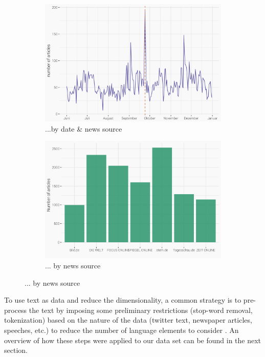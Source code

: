 \documentclass[12pt,a4paper,notitlepage]{article}
\begin{document}
\begin{figure}[H]
	\caption{Article distribution...}
	\begin{center}
		\begin{subfigure}[normla]{0.8\textwidth}
			\includegraphics[width=\textwidth]{../figs/timeline.png}
			\caption{...by date \& news source}
			\label{fig_distr1}
		\end{subfigure}
		\begin{subfigure}[normla]{0.8\textwidth}
			\includegraphics[width=\textwidth]{../figs/bar.png}
			\caption{... by news source}
			\label{fig_distr2}
		\end{subfigure}
	\end{center}
\end{figure}


To use text as data and reduce the dimensionality, a common strategy is to pre-process the text by imposing some preliminary restrictions (stop-word removal, tokenization) based on the nature of the data (twitter text, newspaper articles, speeches, etc.) to reduce the number of language elements to consider \citep{gentzkow_text_2017}. An overview of how these steps were applied to our data set can be found in the next section. 
\end{document}
